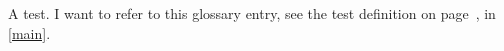 \documentclass{scrbook}
\begin{document}
A \gls{test}. I want to refer to this glossary \gls{entry}, see the
test definition on page~\pageref{glsentry-entry}, in \ref{main}.

\printnoidxglossaries
\end{document}
